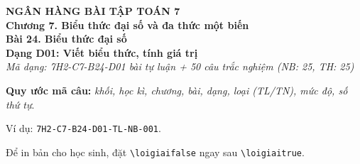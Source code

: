 \documentclass[12pt,a4paper]{article}
\newif\ifloigiai
\begin{document}
\begin{center}
{\Large\textbf{NGÂN HÀNG BÀI TẬP TOÁN 7}}\\[3pt]
\textbf{Chương 7. Biểu thức đại số và đa thức một biến}\\[2pt]
\textbf{Bài 24. Biểu thức đại số}\\[2pt]
\textbf{Dạng D01: Viết biểu thức, tính giá trị}\\[2pt]
\textit{Mã dạng: 7H2-C7-B24-D01  bài tự luận + 50 câu trắc nghiệm \quad (NB: 25, TH: 25)}
\end{center}
\textbf{Quy ước mã câu:} \textit{khối, học kì, chương, bài, dạng, loại (TL/TN), mức độ, số thứ tự}.\par Ví dụ: \texttt{7H2-C7-B24-D01-TL-NB-001}.\par Để in bản cho học sinh, đặt \verb|\loigiaifalse| ngay sau \verb|\loigiaitrue|.
\end{document}
